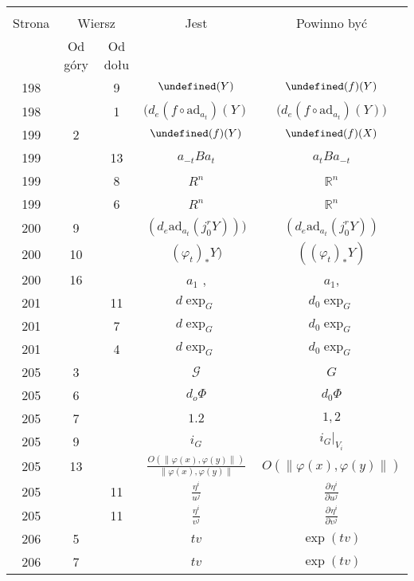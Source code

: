 \documentclass[a4paper,11pt]{article}
\newcommand{\fr}{\frac}
\newcommand{\mb}{\mathbb}
\newcommand{\mc}{\mathcal}
\newcommand{\mr}{\mathrm}
\newcommand{\pr}{\partial}
\newcommand{\ad}{\mr{ad}}
\newcommand{\vp}{\varphi}
\newcommand{\R}{\mb{R}}
\newcommand{\G}{\mc{G}}
\let\L\undefined
\newcommand{\L}{\mc{L}}
\newcommand{\pd}[3]{\frac{ \pr^{ #1 } { #2 } }{ \pr { #3 }^{ #1 } }}
\providecommand{\norm}[1]{\lVert #1 \rVert}
\begin{document}
\begin{center}
  \begin{tabular}{|c|c|c|c|c|}
    \hline
    & \multicolumn{2}{c|}{} & & \\
    Strona & \multicolumn{2}{c|}{Wiersz} & Jest
                              & Powinno być \\ \cline{2-3}
    & Od góry & Od dołu &  &  \\
    \hline
    198 & & 9 & $\L( Y )$ & $\L( f )( Y )$ \\
    198 & & 1 & $( d_{ e }( f \circ \ad_{ a_{ t } } )( Y )$
           & $\big( d_{ e }( f \circ \ad_{ a_{ t } } )( Y ) \big)$ \\
    199 & 2 & & $\L( f )( Y )$ & $\L( f )( X )$ \\
    199 & & 13 & $a_{ -t } B a_{ t }$ & $a_{ t } B a_{ -t }$ \\
    199 & &  8 & $R^{ n }$ & $\R^{ n }$ \\
    199 & &  6 & $R^{ n }$ & $\R^{ n }$ \\
    200 & 9 & & $( d_{ e }\ad_{ a_{ t } }( j^{ r }_{ 0 }Y ) ) )$
           & $( d_{ e }\ad_{ a_{ t } }( j^{ r }_{ 0 }Y ) )$ \\
    200 & 10 & & $( \vp_{ t } )_{ * }Y )$ & $( ( \vp_{ t } )_{ * }Y )$ \\
    200 & 16 & & $a_{ 1 }$ , & $a_{ 1 }$, \\
    201 & & 11 & $d \exp_{ G }$ & $d_{ 0 } \exp_{ G }$ \\
    201 & &  7 & $d \exp_{ G }$ & $d_{ 0 } \exp_{ G }$ \\
    201 & &  4 & $d \exp_{ G }$ & $d_{ 0 } \exp_{ G }$ \\
    205 &  3 & & $\G$ & $G$ \\
    205 &  6 & & $d_{ o }\Phi$ & $d_{ 0 }\Phi$ \\
    205 &  7 & & $1.2$ & $1, 2$ \\
    205 &  9 & & $i_{ G }$ & $i_{ G }|_{ V_{ i } }$ \\
    205 & 13 & & $\fr{ O( \norm{ \vp( x ), \vp( y ) } ) }
                 { \norm{ \vp( x ), \vp( y ) } }$
           & $O( \norm{ \vp( x ), \vp( y ) } )$ \\
    205 & & 11 & $\fr{ \eta^{ i } }{ u^{ j } }$
           & $\pd{}{ { \eta^{ i } } }{ { u^{ j } } }$ \\
    205 & & 11 & $\fr{ \eta^{ i } }{ v^{ j } }$
           & $\pd{}{ { \eta^{ i } } }{ { v^{ j } } }$ \\
    206 &  5 & & $t v$ & $\exp( t v )$ \\
    206 &  7 & & $t v$ & $\exp( t v )$ \\

\end{tabular}
\end{center}
\end{document}
